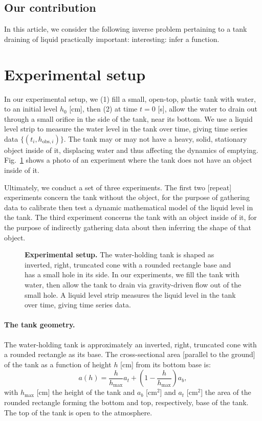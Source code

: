 \documentclass[openacc]{rsproca_new}%
\begin{document}
\subsection{Our contribution}
In this article, we consider the following inverse problem pertaining to a tank draining of liquid
practically important:
interesting: infer a function. 


\section{Experimental setup} \label{sec:expt}
In our experimental setup, we (1) fill a small, open-top, plastic tank with water, to an initial level $h_0$ [cm], then (2) at time $t=0$ [s], allow the water to drain out through a small orifice in the side of the tank, near its bottom. 
We use a liquid level strip to measure the water level in the tank over time, giving time series data $\{(t_i, h_{\text{obs}, i}) \}$. The tank may or may not have a heavy, solid, stationary object inside of it, displacing water and thus affecting the dynamics of emptying. Fig.~\ref{fig:photo_of_tank} shows a photo of an experiment where the tank does not have an object inside of it.

Ultimately, we conduct a set of three experiments. The first two [repeat] experiments concern the tank without the object, for the purpose of gathering data to calibrate then test a dynamic mathematical model of the liquid level in the tank. The third experiment concerns the tank with an object inside of it, for the purpose of indirectly gathering data about then inferring the shape of that object.

\begin{figure}[h!]
\begin{center}
	\caption{\textbf{Experimental setup.} 
	The water-holding tank is shaped as inverted, right, truncated cone with a rounded rectangle base and has a small hole in its side. In our experiments, we fill the tank with water, then allow the tank to drain via gravity-driven flow out of the small hole. A liquid level strip measures the liquid level in the tank over time, giving time series data.
	}
	\label{fig:photo_of_tank}
\end{center}
\end{figure}

\paragraph{The tank geometry.} The water-holding tank is approximately an inverted, right, truncated cone with a rounded rectangle as its base. The cross-sectional area [parallel to the ground] of the tank as a function of height $h$ [cm] from its bottom base is:
\begin{equation}
	a(h) = \frac{h}{h_{\text{max}}}a_t + \left(1-\frac{h}{h_{\text{max}}}\right) a_b, \label{eq:a_of_h}
\end{equation}
with $h_{\text{max}}$ [cm] the height of the tank and $a_b$ [cm$^2$] and $a_t$ [cm$^2$] the area of the rounded rectangle forming the bottom and top, respectively, base of the tank.
The top of the tank is open to the atmosphere. 
\end{document}
